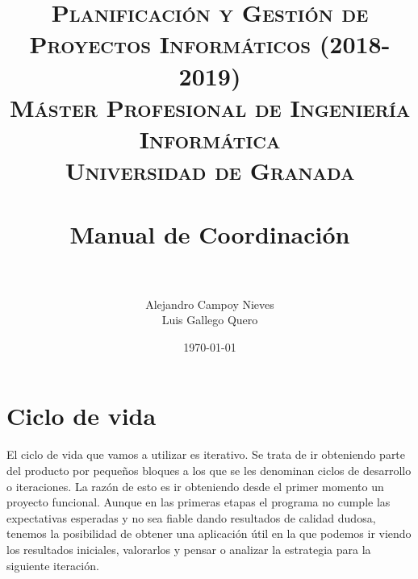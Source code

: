 


\title{	
	\normalfont \normalsize 
	\textsc{\textbf{Planificación y Gestión de Proyectos Informáticos (2018-2019)} \\ Máster Profesional de Ingeniería Informática \\ Universidad de Granada} \\ [25pt] %
	\horrule{0.5pt} \\[0.4cm] %
	\huge Manual de Coordinación \\ %
	\horrule{2pt} \\[0.5cm] %
}

\author{Alejandro Campoy Nieves \\ Luis Gallego Quero} %
\date{\normalsize\today} %
\usepackage{graphicx}
\usepackage{hyperref} %




\maketitle %

\newpage %

\tableofcontents %



\newpage		
 
\section{Ciclo de vida}

El ciclo de vida que vamos a utilizar es iterativo. Se trata de ir obteniendo parte del producto por pequeños bloques a los que se les denominan ciclos de desarrollo o iteraciones. La razón de esto es ir obteniendo desde el primer momento un proyecto funcional. Aunque en las primeras etapas el programa no cumple las expectativas esperadas y no sea fiable dando resultados de calidad dudosa, tenemos la posibilidad de obtener una aplicación útil en la que podemos ir viendo los resultados iniciales, valorarlos y pensar o analizar la estrategia para la siguiente iteración.

